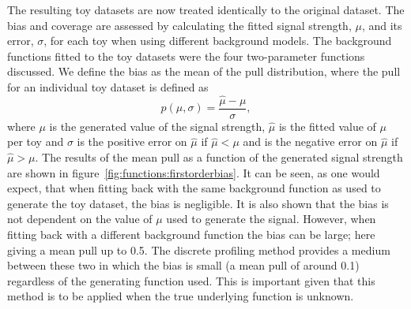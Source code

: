 The resulting toy datasets are now treated identically to the original dataset. The bias and coverage are assessed by calculating the fitted signal strength, $\mu$, and its error, $\sigma$, for each toy when using different background models. The background functions fitted to the toy datasets were the four two-parameter functions discussed.
We define the bias as the mean of the pull distribution, where the pull for an individual toy dataset is defined as
\begin{displaymath}
	p(\mu,\sigma) = \frac{\hat{\mu}-\mu}{\sigma},
\end{displaymath}
where $\mu$ is the generated value of the signal strength, $\hat{\mu}$ is the fitted value of $\mu$ per toy and $\sigma$ is the positive error on $\hat{\mu}$ if $\hat{\mu} < \mu$ and is the negative error on $\hat{\mu}$ if $\hat{\mu} > \mu$. The results of the mean pull as a function of the generated signal strength are shown in figure~\ref{fig:functions:firstorderbias}. It can be seen, as one would expect, that when fitting back with the same background function as used to generate the toy dataset, the bias is negligible. It is also shown that the bias is not dependent on the value of $\mu$ used to generate the signal. However, when fitting back with a different background function the bias can be large; here giving a mean pull up to 0.5.
The discrete profiling method provides a medium between these two in which the bias is small (a mean pull of around 0.1) regardless of the generating function used. This is important given that this method is to be applied when the true underlying function is unknown.
%
